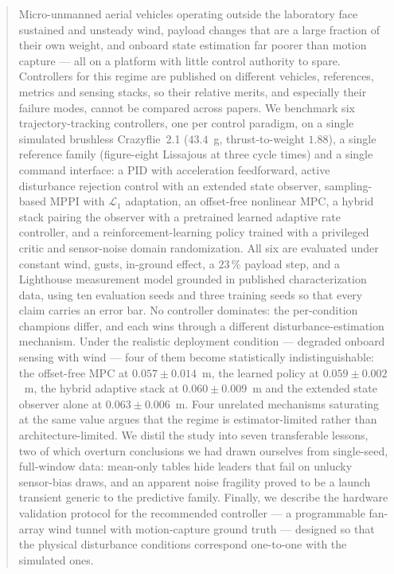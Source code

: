 
\begin{abstract}
Micro-unmanned aerial vehicles operating outside the laboratory face sustained and
unsteady wind, payload changes that are a large fraction of their own weight, and
onboard state estimation far poorer than motion capture --- all on a platform with
little control authority to spare. Controllers for this regime are published on
different vehicles, references, metrics and sensing stacks, so their relative merits,
and especially their failure modes, cannot be compared across papers. We benchmark six
trajectory-tracking controllers, one per control paradigm, on a single simulated
brushless Crazyflie~2.1 ($43.4$~g, thrust-to-weight $1.88$), a single reference family
(figure-eight Lissajous at three cycle times) and a single command interface: a PID with
acceleration feedforward, active disturbance rejection control with an extended state
observer, sampling-based MPPI with $\mathcal{L}_1$ adaptation, an offset-free nonlinear
MPC, a hybrid stack pairing the observer with a pretrained learned adaptive rate
controller, and a reinforcement-learning policy trained with a privileged critic and
sensor-noise domain randomization. All six are evaluated under constant wind, gusts,
in-ground effect, a $23\,\%$ payload step, and a Lighthouse measurement model grounded
in published characterization data, using ten evaluation seeds and three training seeds
so that every claim carries an error bar. No controller dominates: the per-condition
champions differ, and each wins through a different disturbance-estimation mechanism.
Under the realistic deployment condition --- degraded onboard sensing with wind --- four
of them become statistically indistinguishable: the offset-free MPC at
$0.057\pm0.014$~m, the learned policy at $0.059\pm0.002$~m, the hybrid adaptive stack at
$0.060\pm0.009$~m and the extended state observer alone at $0.063\pm0.006$~m. Four
unrelated mechanisms saturating at the same value argues that the regime is
estimator-limited rather than architecture-limited. We
distil the study into seven transferable lessons, two of which overturn conclusions we
had drawn ourselves from single-seed, full-window data: mean-only tables hide leaders
that fail on unlucky sensor-bias draws, and an apparent noise fragility proved to be a
launch transient generic to the predictive family. Finally, we describe the hardware
validation protocol for the recommended controller --- a programmable fan-array wind
tunnel with motion-capture ground truth --- designed so that the physical disturbance
conditions correspond one-to-one with the simulated ones.
\end{abstract}

